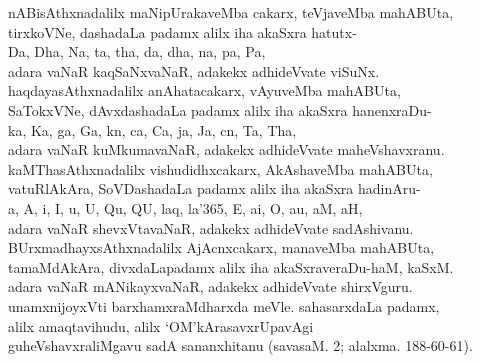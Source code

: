 \begin{entry}
\medskip
\begin{shl}
nABisAthxnadalilx maNipUrakaveMba cakarx, teVjaveMba mahABUta,\\[2pt]
tirxkoVNe, dashadaLa padamx alilx iha akaSxra hatutx-\\[2pt]
Da, Dha, Na, ta, tha, da, dha, na, pa, Pa,\\[2pt]
adara vaNaR kaqSaNxvaNaR, adakekx adhideVvate viSuNx.\\[2pt]
haqdayasAthxnadalilx anAhatacakarx, vAyuveMba mahABUta,\\[2pt]
SaTokxVNe, dAvxdashadaLa padamx alilx iha akaSxra hanenxraDu-\\[2pt]
ka, Ka, ga, Ga, kn, ca, Ca, ja, Ja, cn, Ta, Tha,\\[2pt]
adara vaNaR kuMkumavaNaR, adakekx adhideVvate maheVshavxranu.\\[2pt]
kaMThasAthxnadalilx vishudidhxcakarx, AkAshaveMba mahABUta, \\[2pt]
vatuRlAkAra, SoVDashadaLa padamx alilx iha akaSxra hadinAru-\\[2pt]
a, A, i, I, u, U, Qu, QU, laq, la\char'365, E, ai, O, au, aM, aH,\\[2pt]
adara vaNaR shevxVtavaNaR, adakekx adhideVvate sadAshivanu.\\[2pt]
BUrxmadhayxsAthxnadalilx AjAcnxcakarx, manaveMba mahABUta, \\[2pt]
tamaMdAkAra, divxdaLapadamx alilx iha akaSxraveraDu-haM, kaSxM.\\[2pt]
adara vaNaR mANikayxvaNaR, adakekx adhideVvate shirxVguru.\\[2pt]
unamxnijoyxVti barxhamxraMdharxda meVle. sahasarxdaLa padamx,\\[2pt]
alilx amaqtavihudu, alilx `OM'kArasavxrUpavAgi\\[2pt]
guheVshavxraliMgavu sadA sananxhitanu (savasaM. 2; alalxma. 188-60-61).
\end{shl}
\end{entry}


